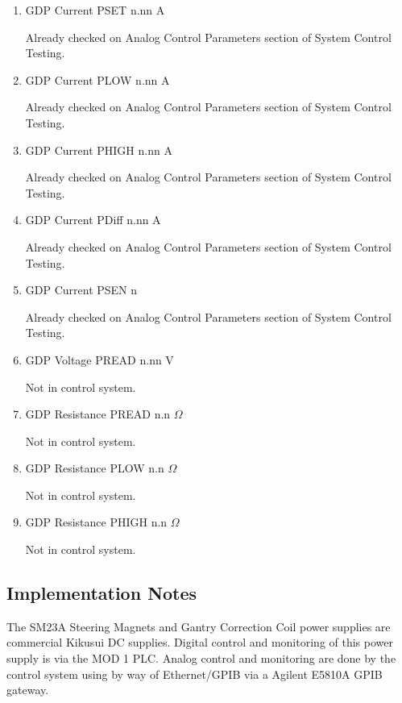 \documentclass[11pt]{book}		%
\begin{document}
\begin{enumerate}
 \item GDP Current PSET  n.nn A

\color{red}
Already checked on Analog Control Parameters section of System Control Testing.
\color{black}

 \item GDP Current PLOW  n.nn A

\color{red}
Already checked on Analog Control Parameters section of System Control Testing.
\color{black}

 \item GDP Current PHIGH n.nn A

\color{red}
Already checked on Analog Control Parameters section of System Control Testing.
\color{black}

 \item GDP Current PDiff n.nn A

\color{red}
Already checked on Analog Control Parameters section of System Control Testing.
\color{black}

 \item GDP Current PSEN  n

\color{red}
Already checked on Analog Control Parameters section of System Control Testing.
\color{black}

 \item GDP Voltage PREAD n.nn V

\color{red}
Not in control system.
\color{black}

 \item GDP Resistance PREAD n.n $\Omega$

\color{red}
Not in control system.
\color{black}

 \item GDP Resistance PLOW n.n $\Omega$

\color{red}
Not in control system.
\color{black}

 \item GDP Resistance PHIGH n.n $\Omega$

\color{red}
Not in control system.
\color{black}

\end{enumerate}

\subsection{Implementation Notes}

The SM23A Steering Magnets and Gantry Correction Coil power supplies are commercial Kikusui DC supplies.  Digital control and monitoring of this power supply is via the MOD 1 PLC.  Analog control and monitoring are done by the control system using by way of Ethernet/GPIB via a Agilent E5810A GPIB gateway.
\end{document}
